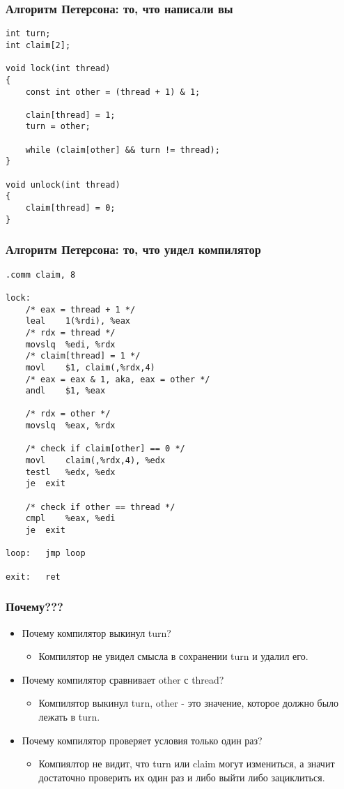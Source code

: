 \begin{frame}[fragile]
\frametitle{Алгоритм Петерсона: то, что написали вы}
\begin{lstlisting}
int turn;
int claim[2];

void lock(int thread)
{
	const int other = (thread + 1) & 1;

	clain[thread] = 1;
	turn = other;

	while (claim[other] && turn != thread);
}

void unlock(int thread)
{
	claim[thread] = 0;
}
\end{lstlisting}
\end{frame}

\begin{frame}[fragile]
\frametitle{Алгоритм Петерсона: то, что уидел компилятор}
\begin{lstlisting}
.comm claim, 8

lock:
	/* eax = thread + 1 */
	leal	1(%rdi), %eax
	/* rdx = thread */
	movslq	%edi, %rdx
	/* claim[thread] = 1 */
	movl	$1, claim(,%rdx,4)
	/* eax = eax & 1, aka, eax = other */
	andl	$1, %eax

	/* rdx = other */
	movslq	%eax, %rdx

	/* check if claim[other] == 0 */
	movl	claim(,%rdx,4), %edx
	testl	%edx, %edx
	je	exit

	/* check if other == thread */
	cmpl	%eax, %edi
	je	exit

loop:	jmp	loop

exit:	ret
\end{lstlisting}
\end{frame}

\begin{frame}
\frametitle{Почему???}
\begin{itemize}
  \item Почему компилятор выкинул turn?
  \begin{itemize}
    \item Компилятор не увидел смысла в сохранении turn и удалил его.
  \end{itemize}
  \item Почему компилятор сравнивает other с thread?
  \begin{itemize}
    \item Компилятор выкинул turn, other - это значение, которое должно было
    лежать в turn.
  \end{itemize}
  \item Почему компилятор проверяет условия только один раз?
  \begin{itemize}
    \item Компиялтор не видит, что turn или claim могут измениться, а значит
    достаточно проверить их один раз и либо выйти либо зациклиться.
  \end{itemize}
\end{itemize}
\end{frame}

